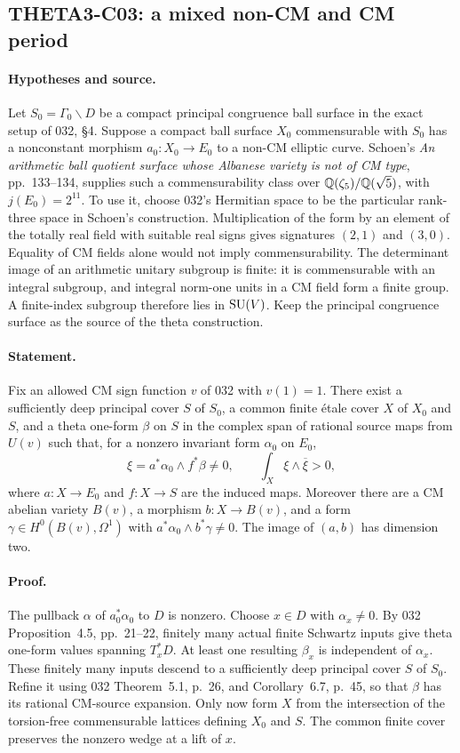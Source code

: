 \subsection{THETA3-C03: a mixed non-CM and CM period}\label{C03}

\paragraph{Hypotheses and source.}
Let $S_0=\Gamma_0\backslash D$ be a compact principal congruence
ball surface in the exact setup of 032, \S4. Suppose a compact ball
surface $X_0$ commensurable with $S_0$ has a nonconstant morphism
$a_0:X_0\to E_0$ to a non-CM elliptic curve.
Schoen's \emph{An arithmetic ball quotient surface whose Albanese
variety is not of CM type}, pp.~133--134, supplies such a
commensurability class over $\mathbb Q(\zeta_5)/\mathbb Q(\sqrt5)$, with
$j(E_0)=2^{11}$. To use it, choose 032's Hermitian space to be the
particular rank-three space in Schoen's construction. Multiplication
of the form by an element of the totally real field with suitable
real signs gives signatures $(2,1)$ and $(3,0)$. Equality of CM
fields alone would not imply commensurability. The determinant image
of an arithmetic unitary subgroup is finite: it is commensurable
with an integral subgroup, and integral norm-one units in a CM field
form a finite group. A finite-index subgroup therefore lies in
$\operatorname{SU}(V)$. Keep the principal congruence surface as the source of the
theta construction.

\paragraph{Statement.}
Fix an allowed CM sign function $v$ of 032 with $v(1)=1$.
There exist a sufficiently deep principal cover $S$ of $S_0$, a
common finite \'etale cover $X$ of $X_0$ and $S$, and a theta
one-form $\beta$ on $S$ in the complex span of rational source maps
from $U(v)$ such that, for a nonzero invariant form $\alpha_0$ on
$E_0$,
\[
 \xi=a^*\alpha_0\wedge f^*\beta\ne0,
 \qquad \int_X\xi\wedge\overline\xi>0,
\]
where $a:X\to E_0$ and $f:X\to S$ are the induced maps. Moreover
there are a CM abelian variety $B(v)$, a morphism $b:X\to B(v)$,
and a form $\gamma\in H^0(B(v),\Omega^1)$ with
$a^*\alpha_0\wedge b^*\gamma\ne0$. The image of $(a,b)$ has
dimension two.

\paragraph{Proof.}
The pullback $\alpha$ of $a_0^*\alpha_0$ to $D$ is nonzero. Choose
$x\in D$ with $\alpha_x\ne0$. By 032 Proposition~4.5,
pp.~21--22, finitely many actual finite Schwartz inputs give theta
one-form values spanning $T_x^*D$. At least one resulting $\beta_x$
is independent of $\alpha_x$. These finitely many inputs descend to
a sufficiently deep principal cover $S$ of $S_0$. Refine it using
032 Theorem~5.1, p.~26, and Corollary~6.7, p.~45, so that $\beta$
has its rational CM-source expansion. Only now form $X$ from the
intersection of the torsion-free commensurable lattices defining
$X_0$ and $S$. The common finite cover preserves the nonzero wedge
at a lift of $x$.

